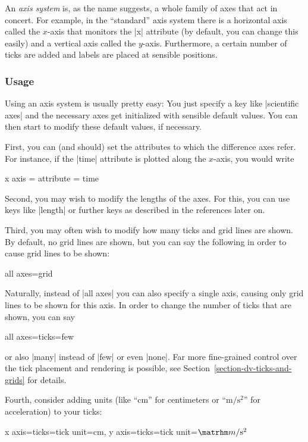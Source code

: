 An \emph{axis system} is, as the name suggests, a whole family of axes
that act in concert. For example, in the ``standard'' axis system there
is a horizontal axis called the $x$-axis that monitors the |x|
attribute (by default, you can change this easily) and a vertical axis
called the $y$-axis. Furthermore, a certain number of ticks are added
and labels are placed at sensible positions.

\subsubsection{Usage}

Using an axis system is usually pretty easy: You just specify a key
like |scientific axes| and the necessary axes get initialized with
sensible default values. You can then start to modify these default
values, if necessary.

First, you can (and should) set the attributes to which the difference 
axes refer. For instance, if the |time| attribute is plotted along the
$x$-axis, you would write
\begin{codeexample}
x axis = {attribute = time}
\end{codeexample}

Second, you may wish to modify the lengths of the axes. For this, you
can use keys like |length| or further keys as described in the
references later on.

Third, you may often wish to modify how many ticks and grid lines are
shown. By default, no grid lines are shown, but you can say the
following in order to cause grid lines to be shown:
\begin{codeexample}
all axes={grid}
\end{codeexample}
Naturally, instead of |all axes| you can also specify a single axis,
causing only grid lines to be shown for this axis.
In order to change the number of ticks that are shown, you can say
\begin{codeexample}
all axes={ticks=few}  
\end{codeexample}
or also |many| instead of |few| or even |none|. Far more fine-grained
control over the tick placement and rendering is possible, 
see Section~\ref{section-dv-ticks-and-grids} for details.

Fourth, consider adding units (like ``cm'' for centimeters or
``$\mathrm m/\mathrm s^2$'' for acceleration) to your ticks:
\begin{codeexample}
x axis={ticks={tick unit=cm}}, y axis={ticks={tick unit=$\matrhm m/\mathrm s^2$}}  
\end{codeexample}


